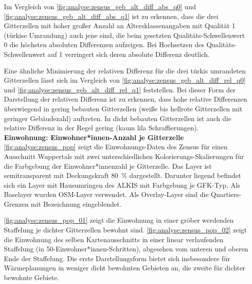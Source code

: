 			Im Vergleich von \autoref{fig:analyse:zensus_geb_alt_diff_abs_q0} und \autoref{fig:analyse:zensus_geb_alt_diff_abs_q1} ist zu erkennen, dass die drei Gitterzellen mit hoher großer Anzahl an Altersklassenangaben mit Qualität 1 (türkise Umrandung) auch jene sind, die beim gesetzten Qualitäts-Schwellenwert 0 die höchsten absoluten Differenzen aufzeigen. Bei Hochsetzen des Qualitäts-Schwellenwert auf 1 verringert sich deren absolute Differenz deutlich. 
			
			Eine ähnliche Minimierung der relativen Differenz für die drei türkis umrandeten Gitterzellen lässt sich im Vergleich von \autoref{fig:analyse:zensus_geb_alt_diff_rel_q0} und \autoref{fig:analyse:zensus_geb_alt_diff_rel_q1} feststellen. Bei dieser Form der Darstellung der relativen Differenz ist zu erkennen, dass hohe relative Differenzen überwiegend in gering bebauten Gitterzellen (weiße bis hellrote Gitterzellen mit geringer Gebäudezahl) auftreten. In dicht bebauten Gitterzellen ist auch die relative Differenz in der Regel gering (kaum lila Schraffierungen). \\
			
			\textbf{Einwohnung: Einwohner*innen-Anzahl je Gitterzelle}\\
			\autoref{fig:analyse:zensus_pop} zeigt die Einwohnungs-Daten des Zensus für einen Ausschnitt Wuppertals mit zwei unterschiedlichen Kolorierungs-Skalierungen für die Farbgebung der Einwohner*innenzahl je Gitterzelle. Das Layer ist semitransparent mit Deckungskraft 80~\% dargestellt. Darunter liegend befindet sich ein Layer mit Hausumringen des ALKIS mit Farbgebung je GFK-Typ. Als Baselayer wurden OSM-Layer verwendet. Als Overlay-Layer sind die Quartiers-Grenzen mit Bezeichnung eingeblendet. 
			
			\autoref{fig:analyse:zensus_pop_01} zeigt die Einwohnung in einer gröber werdenden Staffelung je dichter Gitterzellen bewohnt sind. \autoref{fig:analyse:zensus_pop_02} zeigt die Einwohnung des selben Kartenausschnitts in einer linear verlaufenden Staffelung (in 50-Einwohner*innen-Schritten), abgesehen vom unteren und oberen Ende der Staffelung. Die erste Darstellungsform bietet sich insbesondere für Wärmeplanungen in weniger dicht bewohnten Gebieten an, die zweite für dichter bewohnte Gebiete.  
			
